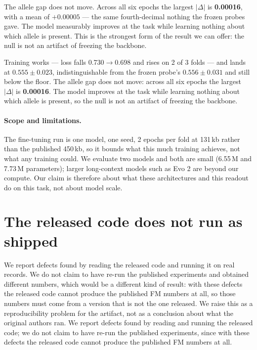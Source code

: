 The allele gap does not move. Across all six epochs the largest $|\Delta|$ is
\textbf{0.00016}, with a mean of $+0.00005$ --- the same fourth-decimal nothing
the frozen probes gave. The model measurably improves at the task while learning
nothing about which allele is present. This is the strongest form of the result
we can offer: the null is not an artifact of freezing the backbone.


\else
Training works --- loss falls 0.730$\to$0.698 and  rises on 2 of 3
folds --- and lands at $0.555 \pm 0.023$, indistinguishable from the frozen
probe's $0.556 \pm 0.031$ and still below the floor. The allele gap does not
move: across all six epochs the largest $|\Delta|$ is \textbf{0.00016}. The model
improves at the task while learning nothing about which allele is present, so the
null is not an artifact of freezing the backbone.
\fi

\paragraph{Scope and limitations.} The fine-tuning run is one model, one seed, 2
epochs per fold at 131\,kb rather than the published 450\,kb, so it bounds what
this much training achieves, not what any training could. We evaluate two models
and both are small (6.55\,M and 7.73\,M parameters); larger long-context models
such as Evo 2 \citep{brixi2026evo2} are beyond our compute. Our claim is
therefore about what these architectures and this readout do on this task, not
about model scale.

\section{The released code does not run as shipped}
\label{sec:code}

\ifdefined\RECOMB
We report defects found by reading the released code and running it on real
records. We do not claim to have re-run the published experiments and obtained
different numbers, which would be a different kind of result: with these defects
the released code cannot produce the published FM numbers at all, so those
numbers must come from a version that is not the one released. We raise this as
a reproducibility problem for the artifact, not as a conclusion about what the
original authors ran.
\else
We report defects found by reading and running the released code; we do not claim
to have re-run the published experiments, since with these defects the released
code cannot produce the published FM numbers at all.
\fi

